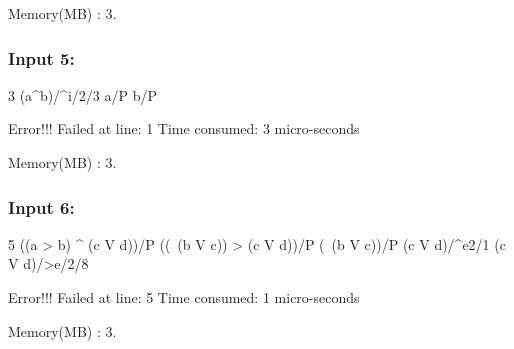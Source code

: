 Memory(\+M\+B) \+: 3.

\subsubsection*{Input 5\+:}


\begin{DoxyCode}
3
(a^b)/^i/2/3
a/P
b/P

Error!!! 
Failed at line: 1
Time consumed: 3 micro-seconds
\end{DoxyCode}


Memory(\+M\+B) \+: 3.

\subsubsection*{Input 6\+:}


\begin{DoxyCode}
5
((a > b) ^ (c V d))/P
((~(b V c)) > (c V d))/P
(~(b V c))/P
(c V d)/^e2/1
(c V d)/>e/2/8

Error!!! 
Failed at line: 5
Time consumed: 1 micro-seconds
\end{DoxyCode}


Memory(\+M\+B) \+: 3. 